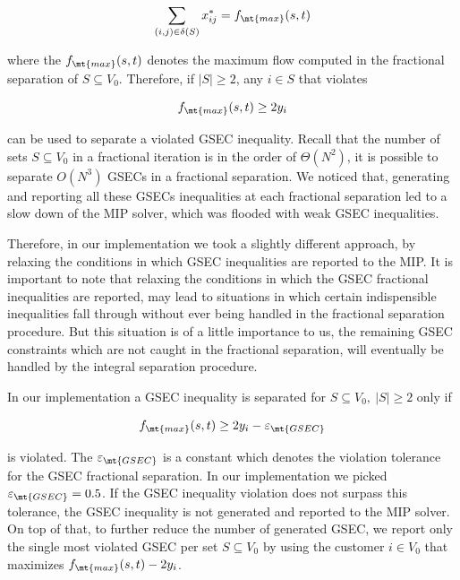 \begin{equation}
	\sum_{(i, j) \in \delta(S)} x^*_{ij} = f_{\mt{max}}(s, t)
\end{equation}

where the $f_{\mt{max}}(s, t)$ denotes the maximum flow computed in the fractional separation of $S \subseteq V_0$.
Therefore, if $|S| \ge 2$, any $i \in S$ that violates

\begin{equation}
	f_{\mt{max}}(s, t) \ge 2 y_i
\end{equation}

can be used to separate a violated GSEC inequality.
Recall that the number of sets $S \subseteq V_0$ in a fractional iteration is in the order of $\Theta(N^2)$, it is possible to separate $O(N^3)$ GSECs in a fractional separation.
We noticed that, generating and reporting all these GSECs inequalities at each fractional separation led to a slow down of the MIP solver, which was flooded with weak GSEC inequalities.

Therefore, in our implementation we took a slightly different approach, by relaxing the conditions in which GSEC inequalities are reported to the MIP.
It is important to note that relaxing the conditions in which the GSEC fractional inequalities are reported, may lead to situations in which certain indispensible inequalities fall through without ever being handled in the fractional separation procedure.
But this situation is of a little importance to us, the remaining GSEC constraints which are not caught in the fractional separation, will eventually be handled by the integral separation procedure.

In our implementation a GSEC inequality is separated for $S \subseteq V_0,\ |S| \ge 2$ only if

\begin{equation}
	f_{\mt{max}}(s, t) \ge 2 y_i - \varepsilon_{\mt{GSEC}}
\end{equation}

is violated.
The $\varepsilon_{\mt{GSEC}}$ is a constant which denotes the violation tolerance for the GSEC fractional separation.
In our implementation we picked $\varepsilon_{\mt{GSEC}} = 0.5$.
If the GSEC inequality violation does not surpass this tolerance, the GSEC inequality is not generated and reported to the MIP solver.
On top of that, to further reduce the number of generated GSEC, we report only the single most violated GSEC per set $S \subseteq V_0$ by using the customer $i \in V_0$ that maximizes $f_{\mt{max}}(s, t) - 2 y_i$.


